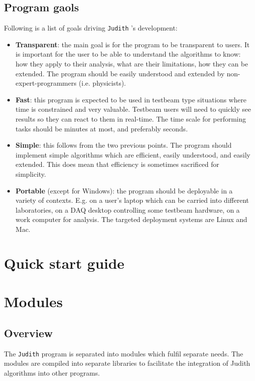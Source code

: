 \documentclass[10pt,a4paper]{book}
\newcommand{\Judith}{\Verb`Judith` }
\begin{document}
\section{Program gaols}

Following is a list of goals driving \Judith's development:

\begin{itemize}
	\item \textbf{Transparent}: the main goal is for the program to be transparent to users. It is important for the user to be able to understand the algorithms to know: how they apply to their analysis, what are their limitations, how they can be extended. The program should be easily understood and extended by non-expert-programmers (i.e. physicists).
	\item \textbf{Fast}: this program is expected to be used in testbeam type situations where time is constrained and very valuable. Testbeam users will need to quickly see results so they can react to them in real-time. The time scale for performing tasks should be minutes at most, and preferably seconds.
	\item \textbf{Simple}: this follows from the two previous points. The program should implement simple algorithms which are efficient, easily understood, and easily extended. This does mean that efficiency is sometimes sacrificed for simplicity.
	\item \textbf{Portable} (except for Windows): the program should be deployable in a variety of contexts. E.g. on a user's laptop which can be carried into different laboratories, on a DAQ desktop controlling some testbeam hardware, on a work computer for analysis. The targeted deployment systems are Linux and Mac.
\end{itemize}

\chapter{Quick start guide}

\chapter{Modules}
\label{ch:modules}

\section{Overview}

The \Judith program is separated into modules which fulfil separate needs. The modules are compiled into separate libraries to facilitate the integration of Judith algorithms into other programs.
\end{document}
